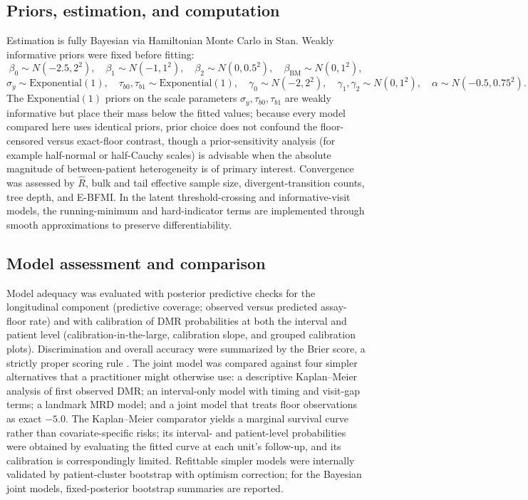 \documentclass[11pt]{article}
\begin{document}
\subsection{Priors, estimation, and computation}
\label{sec:computation}

Estimation is fully Bayesian via Hamiltonian Monte Carlo in Stan.
Weakly informative priors were fixed before fitting:
\[
\beta_0\sim N(-2.5,2^2),\quad
\beta_1\sim N(-1,1^2),\quad
\beta_2\sim N(0,0.5^2),\quad
\beta_{\mathrm{BM}}\sim N(0,1^2),
\]
\[
\sigma_y\sim \mathrm{Exponential}(1),\quad
\tau_{b0},\tau_{b1}\sim \mathrm{Exponential}(1),\quad
\gamma_0\sim N(-2,2^2),\quad
\gamma_1,\gamma_2\sim N(0,1^2),\quad
\alpha\sim N(-0.5,0.75^2).
\]
The $\mathrm{Exponential}(1)$ priors on the scale parameters
$\sigma_y,\tau_{b0},\tau_{b1}$ are weakly informative but place their mass
below the fitted values; because every model compared here uses identical
priors, prior choice does not confound the floor-censored versus exact-floor
contrast, though a prior-sensitivity analysis (for example half-normal or
half-Cauchy scales) is advisable when the absolute magnitude of
between-patient heterogeneity is of primary interest.
Convergence was assessed by $\widehat{R}$, bulk and tail effective sample
size, divergent-transition counts, tree depth, and E-BFMI. In the latent
threshold-crossing and informative-visit models, the running-minimum and
hard-indicator terms are implemented through smooth approximations to
preserve differentiability.

\subsection{Model assessment and comparison}
\label{sec:assessment}

Model adequacy was evaluated with posterior predictive checks for the
longitudinal component (predictive coverage; observed versus predicted
assay-floor rate) and with calibration of DMR probabilities at both the
interval and patient level (calibration-in-the-large, calibration slope,
and grouped calibration plots). Discrimination and overall accuracy were
summarized by the Brier score, a strictly proper scoring rule
\cite{GneitingRaftery2007ProperScoring}. The joint model was compared against four
simpler alternatives that a practitioner might otherwise use: a
descriptive Kaplan--Meier analysis of first observed DMR; an interval-only
model with timing and visit-gap terms; a landmark MRD model; and a joint
model that treats floor observations as exact $-5.0$. The Kaplan--Meier
comparator yields a marginal survival curve rather than covariate-specific
risks; its interval- and patient-level probabilities were obtained by
evaluating the fitted curve at each unit's follow-up, and its calibration is
correspondingly limited. Refittable simpler models were internally validated
by patient-cluster bootstrap with optimism correction; for the Bayesian joint
models, fixed-posterior bootstrap summaries are reported.
\end{document}
